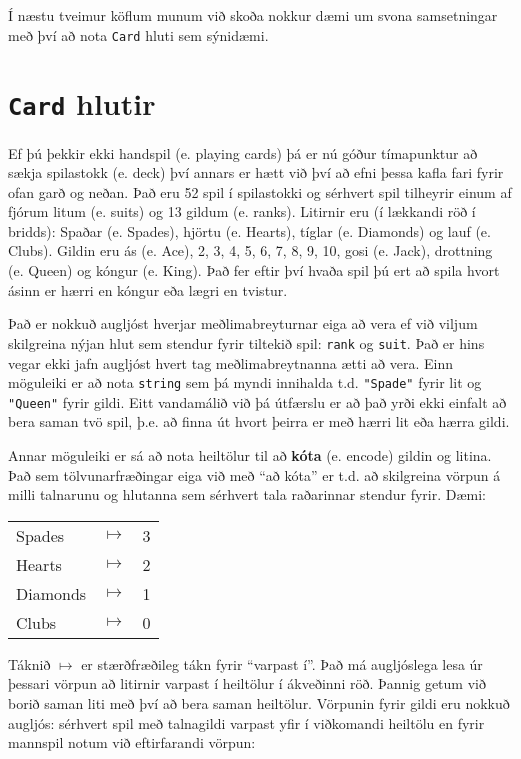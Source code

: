 Í næstu tveimur köflum munum við skoða nokkur dæmi um svona samsetningar með því að nota {\tt Card} hluti sem sýnidæmi. 

\section{{\tt Card} hlutir}

Ef þú þekkir ekki handspil (e. playing cards) þá er nú góður tímapunktur að sækja spilastokk (e. deck) því annars er hætt við því að efni þessa kafla fari fyrir ofan garð og neðan.
Það eru 52 spil í spilastokki og sérhvert spil tilheyrir einum af fjórum litum (e. suits) og 13 gildum (e. ranks).
Litirnir eru (í lækkandi röð í bridds): Spaðar (e. Spades), hjörtu (e. Hearts), tíglar (e. Diamonds) og lauf (e. Clubs).
Gildin eru ás (e. Ace), 2, 3, 4, 5, 6, 7, 8, 9, 10, gosi (e. Jack), drottning (e. Queen) og kóngur (e. King).
Það fer eftir því hvaða spil þú ert að spila hvort ásinn er hærri en kóngur eða lægri en tvistur.


Það er nokkuð augljóst hverjar meðlimabreyturnar eiga að vera ef við viljum skilgreina nýjan hlut sem stendur fyrir tiltekið spil: {\tt rank} og {\tt suit}.
Það er hins vegar ekki jafn augljóst hvert tag meðlimabreytnanna ætti að vera.
Einn möguleiki er að nota {\tt string} sem þá myndi innihalda t.d. \verb+"Spade"+ fyrir lit og \verb+"Queen"+ fyrir gildi.
Eitt vandamálið við þá útfærslu er að það yrði ekki einfalt að bera saman tvö spil, þ.e. að finna út hvort þeirra er með hærri lit eða hærra gildi.


Annar möguleiki er sá að nota heiltölur til að {\bf kóta} (e. encode) gildin og litina. 
Það sem tölvunarfræðingar eiga við með ``að kóta'' er t.d. að skilgreina vörpun á milli talnarunu og hlutanna sem sérhvert tala raðarinnar stendur fyrir.
Dæmi:

\vspace{0.1in}
\begin{tabular}{l c l}
Spades & $\mapsto$ & 3 \\
Hearts & $\mapsto$ & 2 \\
Diamonds & $\mapsto$ & 1 \\
Clubs & $\mapsto$ & 0
\end{tabular}
\vspace{0.1in}

Táknið $\mapsto$ er stærðfræðileg tákn fyrir ``varpast í''. 
Það má augljóslega lesa úr þessari vörpun að litirnir varpast í heiltölur í ákveðinni röð.
Þannig getum við borið saman liti með því að bera saman heiltölur.
Vörpunin fyrir gildi eru nokkuð augljós: sérhvert spil með talnagildi varpast yfir í viðkomandi heiltölu en fyrir mannspil notum við eftirfarandi vörpun:

